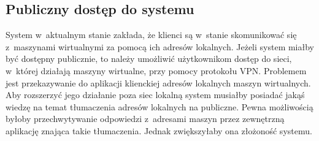 \documentclass[../podsumowanie.tex]{subfiles}
\begin{document}
\subsection{Publiczny dostęp do systemu}

System w~aktualnym stanie zakłada, że klienci są w~stanie skomunikować się z~maszynami wirtualnymi za pomocą ich adresów lokalnych.
Jeżeli system miałby być dostępny publicznie, to należy umożliwić użytkownikom dostęp do sieci, w~której działają maszyny wirtualne, przy pomocy protokołu VPN.
Problemem jest przekazywanie do aplikacji klienckiej adresów lokalnych maszyn wirtualnych.
Aby rozszerzyć jego działanie poza siec lokalną  system musiałby posiadać jakąś wiedzę na temat tłumaczenia adresów lokalnych na publiczne.
Pewna możliwością byłoby przechwytywanie odpowiedzi z~adresami maszyn przez zewnętrzną aplikację znająca takie tłumaczenia.
Jednak zwiększyłaby ona złożoność systemu.
\end{document}
